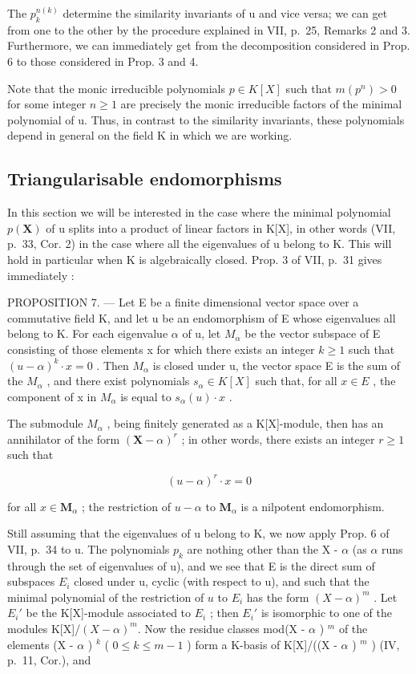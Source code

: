 The \(p_{k}^{n(k)}\) determine the similarity invariants of u and vice versa; we can get from one to the other by the procedure explained in VII, p.~25, Remarks 2 and 3. Furthermore, we can immediately get from the decomposition considered in Prop. 6 to those considered in Prop. 3 and 4.

Note that the monic irreducible polynomials \(p \in K[X]\) such that \(m(p^{n}) > 0\) for some integer \(n \geqslant 1\) are precisely the monic irreducible factors of the minimal polynomial of u. Thus, in contrast to the similarity invariants, these polynomials depend in general on the field K in which we are working.

\subsection{Triangularisable endomorphisms}

In this section we will be interested in the case where the minimal polynomial \(p(\mathbf{X})\) of u splits into a product of linear factors in K{[}X{]}, in other words (VII, p.~33, Cor. 2) in the case where all the eigenvalues of u belong to K. This will hold in particular when K is algebraically closed. Prop. 3 of VII, p.~31 gives immediately :

PROPOSITION 7. --- Let E be a finite dimensional vector space over a commutative field K, and let u be an endomorphism of E whose eigenvalues all belong to K. For each eigenvalue \(\alpha\) of u, let \(M_{\alpha}\) be the vector subspace of E consisting of those elements x for which there exists an integer \(k \geqslant 1\) such that \((u - \alpha)^{k} \cdot x = 0\) . Then \(M_{\alpha}\) is closed under u, the vector space E is the sum of the \(M_{\alpha}\) , and there exist polynomials \(s_{\alpha} \in K[X]\) such that, for all \(x \in E\) , the component of x in \(M_{\alpha}\) is equal to \(s_{\alpha}(u) \cdot x\) .

The submodule \(M_{\alpha}\) , being finitely generated as a K{[}X{]}-module, then has an annihilator of the form \((\mathbf{X}-\alpha)^{r}\) ; in other words, there exists an integer \(r \geqslant 1\) such that

\[
(u - \alpha) ^ {r} \cdot x = 0
\]

for all \(x \in \mathbf{M}_{\alpha}\) ; the restriction of \(u - \alpha\) to \(\mathbf{M}_{\alpha}\) is a nilpotent endomorphism.

Still assuming that the eigenvalues of u belong to K, we now apply Prop. 6 of VII, p.~34 to u. The polynomials \(p_{k}\) are nothing other than the X - \(\alpha\) (as \(\alpha\) runs through the set of eigenvalues of u), and we see that E is the direct sum of subspaces \(E_{i}\) closed under u, cyclic (with respect to u), and such that the minimal polynomial of the restriction of \(u\) to \(E_i\) has the form \((X - \alpha)^m\) . Let \(E_i'\) be the K{[}X{]}-module associated to \(E_i\) ; then \(E_i'\) is isomorphic to one of the modules K{[}X{]}/\((X - \alpha)^{m}\). Now the residue classes mod(X - \(\alpha\) ) \(^m\) of the elements (X - \(\alpha\) ) \(^k\) ( \(0 \leqslant k \leqslant m - 1\) ) form a K-basis of K{[}X{]}/((X - \(\alpha\) ) \(^m\) ) (IV, p.~11, Cor.), and

